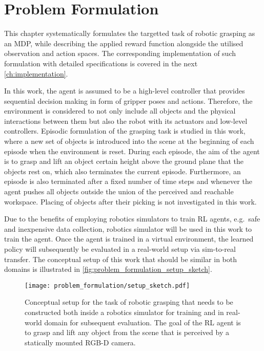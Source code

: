 \chapter{Problem Formulation}\label{ch:problem_formulation}

This chapter systematically formulates the targetted task of robotic grasping as an MDP, while describing the applied reward function alongside the utilised observation and action spaces. The corresponding implementation of such formulation with detailed specifications is covered in the next \autoref{ch:implementation}.

In this work, the agent is assumed to be a high-level controller that provides sequential decision making in form of gripper poses and actions. Therefore, the environment is considered to not only include all objects and the physical interactions between them but also the robot with its actuators and low-level controllers. Episodic formulation of the grasping task is studied in this work, where a new set of objects is introduced into the scene at the beginning of each episode when the environment is reset. During each episode, the aim of the agent is to grasp and lift an object certain height above the ground plane that the objects rest on, which also terminates the current episode. Furthermore, an episode is also terminated after a fixed number of time steps and whenever the agent pushes all objects outside the union of the perceived and reachable workspace. Placing of objects after their picking is not investigated in this work.

Due to the benefits of employing robotics simulators to train RL agents, e.g.~safe and inexpensive data collection, robotics simulator will be used in this work to train the agent. Once the agent is trained in a virtual environment, the learned policy will subsequently be evaluated in a real-world setup via sim-to-real transfer. The conceptual setup of this work that should be similar in both domains is illustrated in \autoref{fig:problem_formulation_setup_sketch}.

\begin{figure}[ht]
    \centering
    \texttt{[image: problem\_formulation/setup\_sketch.pdf]}
    \caption{Conceptual setup for the task of robotic grasping that needs to be constructed both inside a robotics simulator for training and in real-world domain for subsequent evaluation. The goal of the RL agent is to grasp and lift any object from the scene that is perceived by a statically mounted RGB-D camera.}
    \label{fig:problem_formulation_setup_sketch}
\end{figure}


